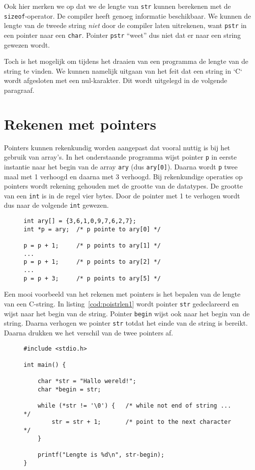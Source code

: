 Ook hier merken we op dat we de lengte van \texttt{str} kunnen berekenen met de \texttt{sizeof}-operator. De compiler heeft genoeg informatie beschikbaar. We kunnen de lengte van de tweede string \textsl{niet} door de compiler laten uitrekenen, want \texttt{pstr} in een pointer naar een \texttt{char}. Pointer \texttt{pstr} ``weet'' dus niet dat er naar een string gewezen wordt.

Toch is het mogelijk om tijdens het draaien van een programma de lengte van de string te vinden. We kunnen namelijk uitgaan van het feit dat een string in `C` wordt afgesloten met een nul-karakter. Dit wordt uitgelegd in de volgende paragraaf.

\section{Rekenen met pointers}
\label{sec:rekenenmetpointers}
Pointers kunnen rekenkundig worden aangepast dat vooral nuttig is bij het gebruik van array's.
In het onderstaande programma wijst pointer \texttt{p} in eerste instantie naar het begin van de array \texttt{ary} (dus \texttt{ary[0]}). Daarna wordt \texttt{p} twee maal met 1 verhoogd en daarna met 3 verhoogd. Bij rekenkundige operaties op pointers wordt rekening gehouden met de grootte van de datatypes. De grootte van een \texttt{int} is in de regel vier bytes. Door de pointer met 1 te verhogen wordt dus naar de volgende \texttt{int} gewezen.

\begin{figure}[!ht]
\begin{lstlisting}[caption=Rekenen met pointers.]
int ary[] = {3,6,1,0,9,7,6,2,7};
int *p = ary;  /* p pointe to ary[0] */

p = p + 1;     /* p points to ary[1] */
...
p = p + 1;     /* p points to ary[2] */
...
p = p + 3;     /* p points to ary[5] */

\end{lstlisting}
\end{figure}

Een mooi voorbeeld van het rekenen met pointers is het bepalen van de lengte van een C-string. In listing~\ref{cod:poistrlen1} wordt pointer \texttt{str} gedeclareerd en wijst naar het begin van de string. Pointer \texttt{begin} wijst ook naar het begin van de string. Daarna verhogen we pointer \texttt{str} totdat het einde van de string is bereikt. Daarna drukken we het verschil van de twee pointers af.

\begin{figure}[!ht]
\begin{lstlisting}[caption=Berekenen van de lengte van een string met behulp van pointers.,label=cod:poistrlen1]
#include <stdio.h>

int main() {

    char *str = "Hallo wereld!";
    char *begin = str;

    while (*str != '\0') {   /* while not end of string ... */
        str = str + 1;       /* point to the next character */
    }

    printf("Lengte is %d\n", str-begin);
}
\end{lstlisting}
\end{figure}

